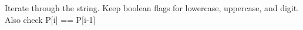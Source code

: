 Iterate through the string. Keep boolean flags for lowercase, uppercase, and digit. Also check P[i] == P[i-1]